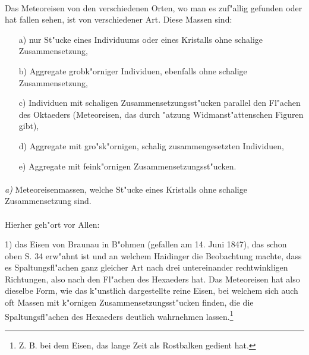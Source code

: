 \documentclass[a4paper, 11pt, oneside, german]{article}
\begin{document}
\paragraph{}
Das Meteoreisen von den verschiedenen Orten, wo man es zuf"allig gefunden oder hat fallen sehen, ist von verschiedener Art. Diese Massen sind:
\begin{itemize}
  \item[a)] nur St"ucke eines Individuums oder eines Kristalls ohne schalige Zusammensetzung,
  \item[b)] Aggregate grobk"orniger Individuen, ebenfalls ohne schalige Zusammensetzung,
  \item[c)] Individuen mit schaligen Zusammensetzungsst"ucken parallel den Fl"achen des Oktaeders (Meteoreisen, das durch "atzung Widmanst"attenschen Figuren gibt),
  \item[d)] Aggregate mit gro"sk"ornigen, schalig zusammengesetzten Individuen,
  \item[e)] Aggregate mit feink"ornigen Zusammensetzungsst"ucken.
\end{itemize}
\paragraph{}
\emph{a)} Meteoreisenmassen, welche St"ucke eines Kristalls ohne schalige Zusammensetzung sind.
\vspace{\medskipamount}
\paragraph{}
Hierher geh"ort vor Allen:

1) das Eisen von Braunau in B"ohmen (gefallen am 14. Juni 1847), das schon oben S. 34 erw"ahnt ist und an welchem Haidinger die Beobachtung machte, dass es Spaltungsfl"achen ganz gleicher Art nach drei untereinander rechtwinkligen Richtungen, also nach den Fl"achen des Hexaeders hat. Das Meteoreisen hat also dieselbe Form, wie das k"unstlich dargestellte reine Eisen, bei welchem sich auch oft Massen mit k"ornigen Zusammensetzungsst"ucken finden, die die Spaltungsfl"achen des Hexaeders deutlich wahrnehmen lassen.\footnote{Z. B. bei dem Eisen, das lange Zeit als Rostbalken gedient hat.}
\end{document}
